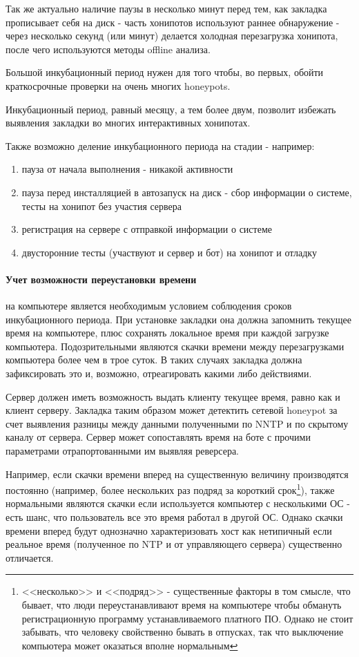 Так же актуально наличие паузы в несколько минут перед тем, как закладка
 прописывает себя на диск - часть хонипотов используют раннее обнаружение -
через несколько секунд (или минут) делается холодная перезагрузка хонипота,
после чего используются методы offline анализа.

Большой инкубационный период нужен для того чтобы, во первых, обойти
краткосрочные проверки на очень многих honeypots.

Инкубационный период, равный месяцу, а тем более двум,  позволит
избежать выявления закладки во многих интерактивных хонипотах.

Также возможно деление инкубационного периода на стадии - например:
\begin{enumerate}
 \item {пауза от начала выполнения - никакой активности }
 \item {пауза перед инсталляцией в автозапуск на диск - сбор информации о системе,
тесты на хонипот без участия сервера}
 \item {регистрация на сервере с отправкой информации о системе}
 \item {двусторонние тесты (участвуют и сервер и бот) на хонипот и отладку}
\end{enumerate}


\paragraph{Учет возможности переустановки времени}

на компьютере является необходимым условием соблюдения сроков
инкубационного периода. При установке закладки она должна запомнить
текущее время на компьютере, плюс сохранять локальное время при каждой
загрузке компьютера. Подозрительными являются скачки времени между
перезагрузками компьютера более чем в трое суток. В таких случаях
закладка должна зафиксировать это и, возможно, отреагировать какими либо
действиями.

Сервер должен иметь возможность выдать клиенту текущее время,  равно как и клиент серверу. Закладка таким образом может детектить сетевой honeypot за счет выявления разницы между данными полученными по NNTP и по скрытому каналу от сервера. Сервер может сопоставлять
время на боте с прочими параметрами отрапортованными им выявляя реверсера.

Например, если скачки времени вперед на существенную величину
производятся постоянно (например, более нескольких раз
подряд за короткий срок\footnote{<<несколько>> и <<подряд>> - существенные факторы в том
смысле, что бывает, что люди переустанавливают время на компьютере чтобы
обмануть регистрационную программу устанавливаемого платного ПО. Однако не стоит
забывать, что человеку свойственно бывать в отпусках, так что выключение компьютера
может оказаться вполне нормальным}), также нормальными являются скачки если используется компьютер с несколькими ОС - есть шанс, что пользователь все это время работал в другой ОС. Однако скачки времени вперед будут однозначно характеризовать хост как нетипичный если реальное время (полученное по NTP и от управляющего сервера) существенно отличается.\\

